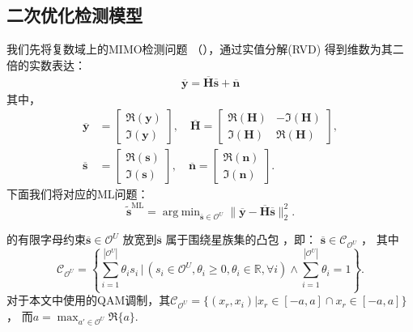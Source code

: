 \documentclass[bachelor,oneside]{seuthesis} %
\begin{document}
\begin{spacing}{1.5}
\begin{Main}
\subsection{二次优化检测模型}\label{sec:quad}
我们先将复数域上的MIMO检测问题 （），通过实值分解(RVD) 得到维数为其二倍的实数表达：
\begin{eqnarray}
 \overline{\mathbf{y}}= \overline{\mathbf{H}} \overline{\mathbf{s}}+ \overline{\mathbf{n}}
\end{eqnarray}\label{eq:MIMORE}
其中，
\begin{align*}
 \overline { {\mathbf {y}}}&= \left [{{\begin{array}{c} \Re ({\mathbf {y}}) \\ \Im ({\mathbf {y}}) \end{array}}}\right ], \quad \overline { {\mathbf {H}}} = \left [{{\begin{array}{cc} \Re ({\mathbf {H}}) & -\Im ({\mathbf {H}}) \\ \Im ({\mathbf {H}}) & \Re ({\mathbf {H}}) \end{array}}}\right ], \\ \overline { {\mathbf {s}}}&= \left [{{\begin{array}{c} \Re ({\mathbf {s}}) \\ \Im ({\mathbf {s}}) \end{array}}}\right ],\quad \overline { {\mathbf {n}}} = \left [{{\begin{array}{c} \Re ({\mathbf {n}}) \\ \Im ({\mathbf {n}}) \end{array}}}\right ]\!.
\end{align*}
下面我们将对应的ML问题：
\begin{equation} \label{eq:MLr}
\tilde { {\mathbf {s}}}^{\text {ML}} = \mathop {\mathrm {arg\;min}} _{ \overline{\mathbf {s}}\in \mathcal{O} ^U} \| \overline{\mathbf {y}}- \overline{\mathbf {H}} \overline{\mathbf {s}}\|_{2}^{2}.
 \end{equation}

的有限字母约束$ \overline {\mathbf{s}}\in \mathcal{O} ^U$ 放宽到$ \overline{\mathbf{s}}$ 属于围绕星族集的凸包
\cite{boyd2004convex}，即：
$\overline{\mathbf{s}}\in \mathcal {C}_{\mathcal{O} ^U}$ ， 其中
\begin{equation}
{ {\mathcal {C}}_ {\mathcal{O} ^U}= \left \{{{\sum _{i=1}^{ {\left |{{ {\mathcal{O} ^U}}}\right |}}\theta _{i} s_{i} {\,|\,}(s_{i} \in\mathcal{O} ^U, \theta _{i}\geq 0, \theta _{i} \in \mathbb {R},\forall i) \wedge \sum _{i=1}^{ {\left |{{ \mathcal{O}^U}}\right |}}\theta _{i}=1}}\right \}\!.}
 \end{equation}\label{eqn:qam}
 对于本文中使用的QAM调制，其${\mathcal {C}}_ {\mathcal{O} ^U}=\{(x_{r}, x_{i})|x_{r}\in[-a,a]\cap x_{r}\in[-a,a]\}$， 而$a=\max_{a'\in {\mathcal{O} ^U}}\Re{\{a\}}$.


\end{Main}
\end{spacing}
\end{document}

